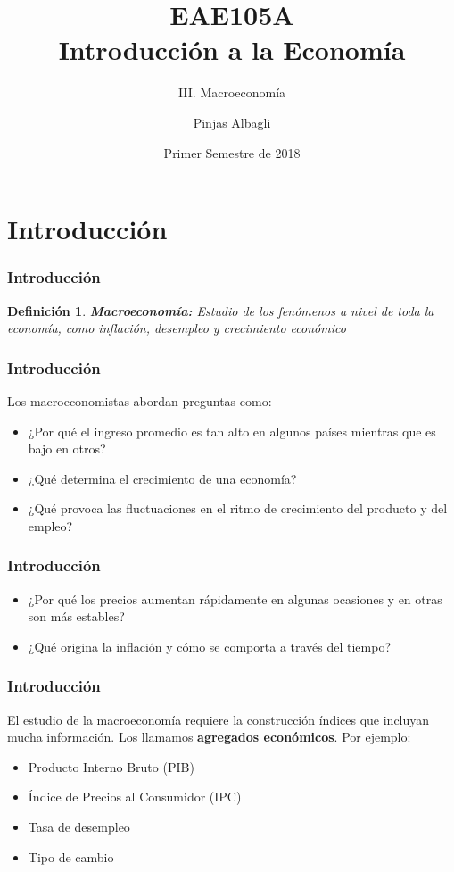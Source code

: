 \documentclass[dvipsnames,table,leqno]{beamer}
\title{EAE105A \\ Introducción a la Economía}
\subtitle{III. Macroeconomía}
\author{Pinjas Albagli}
\institute{Instituto de Economía \\ Pontificia Universidad Católica de Chile}
\date{Primer Semestre de 2018}
\newtheorem{mydef}{Definición}
\begin{document}
	\maketitle 
	
	\section{Introducción}
	
		\begin{frame}
			\frametitle{Introducción}
			\begin{mydef}
				\textbf{Macroeconomía:} Estudio de los fenómenos a nivel de toda la economía, como inflación, desempleo y crecimiento económico
			\end{mydef}
		\end{frame}

		\begin{frame}
			\frametitle{Introducción}
			Los macroeconomistas abordan preguntas como:
			\begin{itemize}
				\item ¿Por qué el ingreso promedio es tan alto en algunos países mientras que es bajo en otros?
				\item ¿Qué determina el crecimiento de una economía?
				\item ¿Qué provoca las fluctuaciones en el ritmo de crecimiento del producto y del empleo?
			\end{itemize}
		\end{frame}

		\begin{frame}
			\frametitle{Introducción}
			\begin{itemize}
				\item ¿Por qué los precios aumentan rápidamente en algunas ocasiones y en otras son más estables?
				\item ¿Qué origina la inflación y cómo se comporta a través del tiempo?
			\end{itemize}
		\end{frame}

		\begin{frame}
			\frametitle{Introducción}
			El estudio de la macroeconomía requiere la construcción índices que incluyan mucha información. Los llamamos \textbf{agregados económicos}. Por ejemplo:
			\begin{itemize}
				\item Producto Interno Bruto (PIB)
				\item Índice de Precios al Consumidor (IPC)
				\item Tasa de desempleo
				\item Tipo de cambio
			\end{itemize}
		\end{frame}
\end{document}
